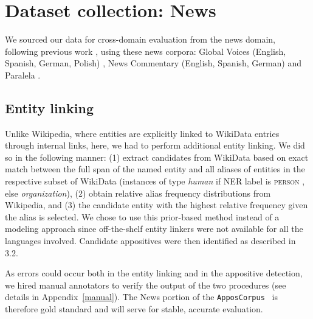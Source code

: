 \documentclass[11pt]{article}
\newcommand{\dltodo}[1]{\todo[color=yellow!20]{#1}}
\newcommand{\jttodo}[1]{\todo[color=blue!20]{#1}}
\newcommand{\corpus}{\texttt{ApposCorpus}}
\begin{document}
\section{Dataset collection: News}
\label{sec:gold_data}

We sourced our data for cross-domain evaluation from the news domain, following previous work \cite{kang2019pomo}, using these news corpora: Global Voices (English, Spanish, German, Polish) \cite{TIEDEMANN12.463}, News Commentary (English, Spanish, German) \cite{TIEDEMANN12.463} and Paralela \cite{pkezik2016exploring}.  %


\subsection{Entity linking} Unlike Wikipedia, where entities are explicitly linked to WikiData entries through internal links, here, we had to perform additional entity linking. We did so in the following manner: (1) extract candidates from WikiData based on exact match between the full span of the named entity and all aliases of entities in the respective subset of WikiData (instances of type \textit{human} if NER label is \textsc{person} , else \textit{organization}), (2) obtain relative alias frequency distributions from Wikipedia, and (3) the candidate entity with the highest relative frequency given the alias is selected. We chose to use this prior-based method instead of a modeling approach since off-the-shelf entity linkers were not available for all the languages involved. 
Candidate appositives were then identified as described in 3.2. 

As errors could occur both in the entity linking and in the appositive detection, we hired manual annotators to verify the output of the two procedures (see details in Appendix~\ref{manual}). The News portion of the \corpus~ is therefore gold standard and will serve for stable, accurate evaluation. 
\end{document}

